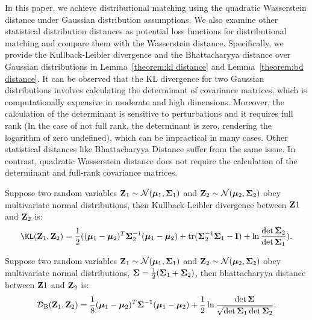 In this paper, we achieve distributional matching using the quadratic Wasserstein distance under Gaussian distribution assumptions. We also examine other statistical distribution distances as potential loss functions for distributional matching and compare them with the Wasserstein distance. Specifically, we provide the Kullback-Leibler divergence and the Bhattacharyya distance over Gaussian distributions in Lemma~\ref{theorem:kl distance} and Lemma~\ref{theorem:bd distance}. It can be observed that the KL divergence for two Gaussian distributions involves calculating the determinant of covariance matrices, which is computationally expensive in moderate and high dimensions. Moreover, the calculation of the determinant is sensitive to perturbations and it requires full rank (In the case of not full rank, the determinant is zero, rendering the logarithm of zero undefined), which can be impractical in many cases. Other statistical distances like Bhattacharyya Distance suffer from the same issue. In contrast, quadratic Wasserstein distance does not require the calculation of the determinant and full-rank covariance matrices.

\begin{lemma} \label{theorem:kl distance} 
Suppose two random variables $\mathbf{Z}_1 \sim \mathcal{N}(\bm \mu_1, \mathbf{\Sigma}_1)$ and $\mathbf{Z}_2 \sim \mathcal{N}(\bm \mu_2, \mathbf{\Sigma}_2)$ obey multivariate normal distributions, then Kullback-Leibler divergence between $\mathbf{Z}1$ and $\mathbf{Z}_2$ is:
\begin{align}
\KL(\m Z_1, \m Z_2) = \frac{1}{2}((\bm \mu_1-\bm \mu_2)^T \m \Sigma_2^{-1}(\bm \mu_1-\bm \mu_2) + \tr(\m \Sigma_2^{-1}\m \Sigma_1-\m I) + \ln{\frac{\det{\m \Sigma_2}}{\det \m \Sigma_1}}). \nonumber
\end{align}
\end{lemma}

\begin{lemma}
\label{theorem:bd distance}
Suppose two random variables $\mathbf{Z}_1 \sim \mathcal{N}(\bm \mu_1, \mathbf{\Sigma}_1)$ and $\mathbf{Z}_2 \sim \mathcal{N}(\bm \mu_2, \mathbf{\Sigma}_2)$ obey multivariate normal distributions, $\mathbf{\Sigma} = \frac{1}{2}(\mathbf{\Sigma}_1 + \mathbf{\Sigma}_2)$, then bhattacharyya distance between $\mathbf{Z}1$ and $\mathbf{Z}_2$ is:
\begin{align}
\mathcal{D}_{\textrm{B}}(\mathbf{Z}_1, \mathbf{Z}_2) = \frac{1}{8}(\bm \mu_1-\bm \mu_2)^T \mathbf{\Sigma}^{-1}(\bm \mu_1-\bm \mu_2) + \frac{1}{2}\ln \frac{\det \mathbf{\Sigma}}{\sqrt{\det \mathbf{\Sigma}_1 \det \mathbf{\Sigma}_2}}. \nonumber
\end{align}
\end{lemma}

